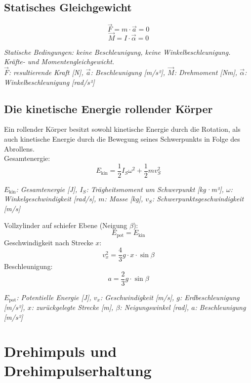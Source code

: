 \documentclass[a4paper,10pt]{article}
\newenvironment{displayformula}
{
	\begin{framed}
		\color{formulaColor}
	}
	{\end{framed}}
\newcommand{\formulalegend}[1]{%
	\par\vspace{0.5ex}%
	{{\color{legendColor}\RaggedRight\small\textit{#1}}}%
	\par\vspace{1.5ex}%
}
\begin{document}
\subsection{Statisches Gleichgewicht}

\begin{displayformula}
	\[
	\vec{F} = m \cdot \vec{a} = 0
	\]
	\[
	\vec{M} = I \cdot \vec{\alpha} = 0
	\]
\end{displayformula}
\formulalegend{
	Statische Bedingungen: keine Beschleunigung, keine Winkelbeschleunigung. Kräfte- und Momentengleichgewicht.\\
	\( \vec{F} \): resultierende Kraft [N], \( \vec{a} \): Beschleunigung [m/s²], \( \vec{M} \): Drehmoment [Nm], \( \vec{\alpha} \): Winkelbeschleunigung [rad/s²]
}

\subsection{Die kinetische Energie rollender Körper}

\begin{displayformula}
	Ein rollender Körper besitzt sowohl kinetische Energie durch die Rotation, als auch kinetische Energie durch die Bewegung seines Schwerpunkts in Folge des Abrollens. \\ 
	Gesamtenergie:
	\[
	E_{\text{kin}} = \frac{1}{2} I_S \omega^2 + \frac{1}{2} m v_S^2
	\]
\end{displayformula}
\formulalegend{
	\( E_{\text{kin}} \): Gesamtenergie [J], \( I_S \): Trägheitsmoment um Schwerpunkt [kg·m²], \( \omega \): Winkelgeschwindigkeit [rad/s], \( m \): Masse [kg], \( v_S \): Schwerpunktsgeschwindigkeit [m/s]
}

\begin{displayformula}
	Vollzylinder auf schiefer Ebene (Neigung \( \beta \)):
	\[
	E_{\text{pot}} = E_{\text{kin}}
	\]
	Geschwindigkeit nach Strecke \( x \):
	\[
	v_x^2 = \frac{4}{3} g \cdot x \cdot \sin\beta
	\]
	Beschleunigung:
	\[
	a = \frac{2}{3} g \cdot \sin\beta
	\]
\end{displayformula}
\formulalegend{
	\( E_{\text{pot}} \): Potentielle Energie [J], \( v_x \): Geschwindigkeit [m/s], \( g \): Erdbeschleunigung [m/s²], \( x \): zurückgelegte Strecke [m], \( \beta \): Neigungswinkel [rad], \( a \): Beschleunigung [m/s²]
}

\section{Drehimpuls und Drehimpulserhaltung}
\end{document}
